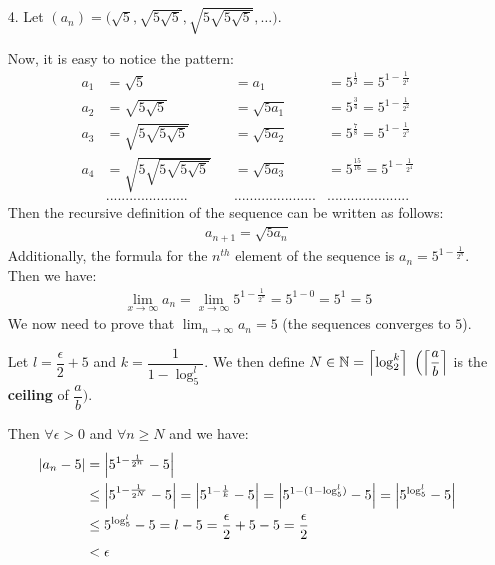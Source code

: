 \documentclass[11pt]{article}
\DeclarePairedDelimiter\abs{\lvert}{\rvert}%
\DeclarePairedDelimiter\absb{\Big\lvert}{\Big\rvert}%
\DeclarePairedDelimiter{\ceilb}{\Big\lceil}{\Big\rceil}
\newcommand{\nats}{\mathbb{N}}
\begin{document}
\begin{itemize}
        \newpage
        \item[4.]
            Let $(a_n) = \Big(\sqrt{5}, \sqrt{5\sqrt{5}}, \sqrt{5\sqrt{5\sqrt{5}}}, \dots\Big)$.

            Now, it is easy to notice the pattern:
            \begin{align*}
                a_1 &= \sqrt{5}                         &&= a_1         &= 5^{\frac{1}{2}}   = 5^{1 - \frac{1}{2^{1}}}\\
                a_2 &= \sqrt{5\sqrt{5}}                 &&= \sqrt{5a_1} &= 5^{\frac{3}{4}}   = 5^{1 - \frac{1}{2^{2}}}\\
                a_3 &= \sqrt{5\sqrt{5\sqrt{5}}}         &&= \sqrt{5a_2} &= 5^{\frac{7}{8}}   = 5^{1 - \frac{1}{2^{3}}}\\
                a_4 &= \sqrt{5\sqrt{5\sqrt{5\sqrt{5}}}} &&= \sqrt{5a_3} &= 5^{\frac{15}{16}} = 5^{1 - \frac{1}{2^{4}}}\\
                    & .....................             && ..................... & .....................
            \end{align*}
            Then the recursive definition of the sequence can be written as follows:
            \begin{align*}
                a_{n + 1} = \sqrt{5a_{n}}
            \end{align*}
            Additionally, the formula for the $n^{th}$ element of the sequence
            is $a_n = 5^{1 - \frac{1}{2^{n}}}$. Then we have:
            \begin{align*}
                \lim_{x \to \infty}a_n = \lim_{x \to \infty}5^{1 - \frac{1}{2^{n}}} = 5^{1 - 0} = 5^1 = 5
            \end{align*}
            We now need to prove that $\lim_{n \to \infty}a_n = 5$ (the
            sequences converges to $5$).

            Let $l = \dfrac{\epsilon}{2} + 5$ and $k = \dfrac{1}{1 - \log_5^{l}}$.
            We then define $N \in \nats = \ceilb{\log_2^{k}}$
            $\Big(\ceilb{\dfrac{a}{b}}$ is the \textbf{ceiling} of $\dfrac{a}{b}\Big)$.

            Then $\forall \epsilon > 0$ and $\forall n \geq N$ and we have:
            \begin{align*}
                \abs{a_n - 5} &= \absb{5^{1 - \frac{1}{2^{n}}} - 5}\\
                              &\leq \absb{5^{1 - \frac{1}{2^{N}}} - 5}
                                   = \absb{5^{1 - \frac{1}{k}} - 5}
                                   = \absb{5^{1 - (1 - \log_5^l)} - 5}
                                   = \absb{5^{\log_5^l} - 5}\\
                              &\leq 5^{\log_5^l} - 5
                                   = l - 5
                                   = \frac{\epsilon}{2} + 5 - 5
                                   = \frac{\epsilon}{2}\\
                              &< \epsilon
            \end{align*}


\end{itemize}
\end{document}
